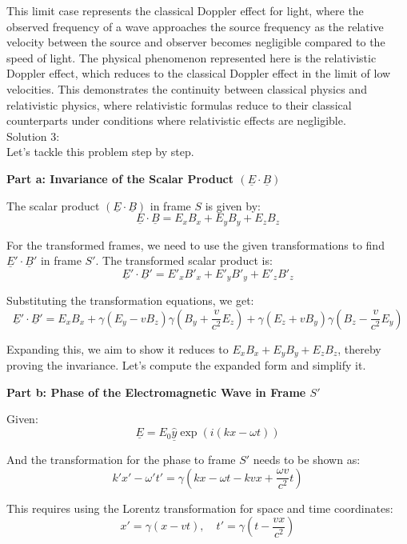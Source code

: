 \documentclass[a4paper,11pt]{article}
\begin{document}
This limit case represents the classical Doppler effect for light, where the observed frequency of a wave approaches the source frequency as the relative velocity between the source and observer becomes negligible compared to the speed of light. The physical phenomenon represented here is the relativistic Doppler effect, which reduces to the classical Doppler effect in the limit of low velocities. This demonstrates the continuity between classical physics and relativistic physics, where relativistic formulas reduce to their classical counterparts under conditions where relativistic effects are negligible. \\

\noindent Solution 3: \\

Let's tackle this problem step by step.

\textbf{Part a: Invariance of the Scalar Product \( (\underline{E} \cdot \underline{B}) \)}

The scalar product \( (\underline{E} \cdot \underline{B}) \) in frame \( S \) is given by:
\[
\underline{E} \cdot \underline{B} = E_{x}B_{x} + E_{y}B_{y} + E_{z}B_{z}
\]

For the transformed frames, we need to use the given transformations to find \( \underline{E}' \cdot \underline{B}' \) in frame \( S' \). The transformed scalar product is:
\[
\underline{E}' \cdot \underline{B}' = E'_{x}B'_{x} + E'_{y}B'_{y} + E'_{z}B'_{z}
\]

Substituting the transformation equations, we get:
\[
\underline{E}' \cdot \underline{B}' = E_{x}B_{x} + \gamma(E_{y} - vB_{z})\gamma(B_{y} + \frac{v}{c^{2}}E_{z}) + \gamma(E_{z} + vB_{y})\gamma(B_{z} - \frac{v}{c^{2}}E_{y})
\]

Expanding this, we aim to show it reduces to \( E_{x}B_{x} + E_{y}B_{y} + E_{z}B_{z} \), thereby proving the invariance. Let's compute the expanded form and simplify it.

\textbf{Part b: Phase of the Electromagnetic Wave in Frame \( S' \)}

Given:
\[
\underline{E} = E_{0} \hat{\underline{y}} \exp(i(kx - \omega t))
\]

And the transformation for the phase to frame \( S' \) needs to be shown as:
\[
k'x' - \omega' t' = \gamma(kx - \omega t - kvx + \frac{\omega v}{c^{2}} t)
\]

This requires using the Lorentz transformation for space and time coordinates:
\[
x' = \gamma(x - vt), \quad t' = \gamma\left(t - \frac{vx}{c^{2}}\right)
\]
\end{document}
